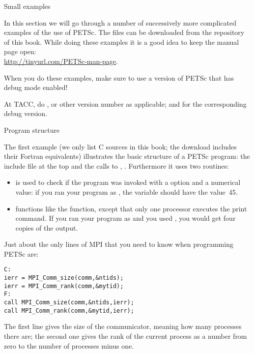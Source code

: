  {Small examples}

In this section we will go through a number of successively more
complicated examples of the use of PETSc. The files can be downloaded
from the repository of this book.
While doing these
examples it is a good idea to keep the manual page open:\\
\url{http://tinyurl.com/PETSc-man-page}.

When you do these examples, make sure to use a version of PETSc that
has debug mode enabled!
\begin{istc}
At TACC, do , or other version number
as applicable; and  for the
corresponding debug version.
\end{istc}

 {Program structure}

The first example (we only list C sources in this book; the download
includes their Fortran equivalents) illustrates the basic structure of
a PETSc program: the include file at the top and the calls to
, . Furthermore it uses two
routines:
\begin{itemize}
\item {} is used to check if the program was
  invoked with a  option and a numerical value: if you ran your
  program as , the variable  should have the
  value~45.
\item {} functions like the  function, except
  that only one processor executes the print command. If you ran your
  program as  and you used , you would
  get four copies of the output.
\end{itemize}


Just about  the only lines
of MPI that you need to know when programming PETSc are:
\begin{verbatim}
C:
ierr = MPI_Comm_size(comm,&ntids);
ierr = MPI_Comm_rank(comm,&mytid);
F:
call MPI_Comm_size(comm,&ntids,ierr);
call MPI_Comm_rank(comm,&mytid,ierr);
\end{verbatim}
The first line gives the size of the communicator, meaning how many
processes there are; the second one gives the rank of the current
process as a number from zero to the number of processes minus one.

